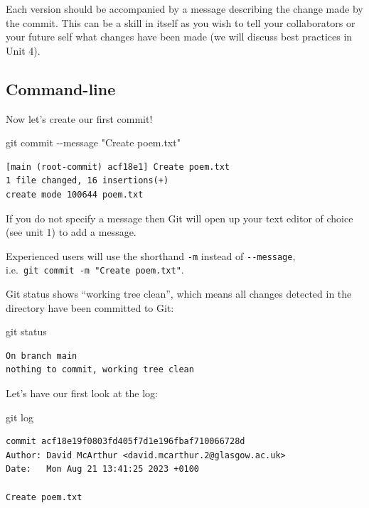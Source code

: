 \documentclass[
  letterpaper,
  DIV=11,
  numbers=noendperiod]{scrartcl}
\newenvironment{Shaded}{\begin{snugshade}}{\end{snugshade}}
\newcommand{\NormalTok}[1]{\textcolor[rgb]{0.00,0.23,0.31}{#1}}
\newcommand{\SpecialCharTok}[1]{\textcolor[rgb]{0.37,0.37,0.37}{#1}}
\newcommand{\StringTok}[1]{\textcolor[rgb]{0.13,0.47,0.30}{#1}}
\begin{document}
Each version should be accompanied by a message describing the change
made by the commit. This can be a skill in itself as you wish to tell
your collaborators or your future self what changes have been made (we
will discuss best practices in Unit 4).

\subsection{Command-line}

Now let's create our first commit!

\begin{Shaded}
\begin{Highlighting}[]
\NormalTok{git commit }\SpecialCharTok{{-}{-}}\NormalTok{message }\StringTok{"Create poem.txt"}
\end{Highlighting}
\end{Shaded}

\begin{verbatim}
[main (root-commit) acf18e1] Create poem.txt
1 file changed, 16 insertions(+)
create mode 100644 poem.txt
\end{verbatim}

If you do not specify a message then Git will open up your text editor
of choice (see unit 1) to add a message.

Experienced users will use the shorthand \texttt{-m} instead of
\texttt{-\/-message}, i.e.~\texttt{git\ commit\ -m\ "Create\ poem.txt"}.

Git status shows ``working tree clean'', which means all changes
detected in the directory have been committed to Git:

\begin{Shaded}
\begin{Highlighting}[]
\NormalTok{git status}
\end{Highlighting}
\end{Shaded}

\begin{verbatim}
On branch main
nothing to commit, working tree clean
\end{verbatim}

Let's have our first look at the log:

\begin{Shaded}
\begin{Highlighting}[]
\NormalTok{git log}
\end{Highlighting}
\end{Shaded}

\begin{verbatim}
commit acf18e19f0803fd405f7d1e196fbaf710066728d
Author: David McArthur <david.mcarthur.2@glasgow.ac.uk>
Date:   Mon Aug 21 13:41:25 2023 +0100

Create poem.txt
\end{verbatim}
\end{document}
